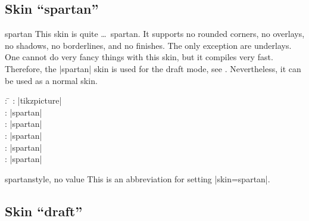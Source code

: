 \clearpage

\subsection{Skin \enquote{spartan}}\label{subsec:spartan}

\begin{docSkin}{spartan}
  This skin is quite \ldots\ spartan.
  It supports no rounded corners, no overlays, no shadows, no borderlines,
  and no finishes. The only exception are underlays.
  One cannot do very fancy things with this skin, but it compiles very fast.
  Therefore, the |spartan| skin is
  used for the draft mode, see .
  Nevertheless, it can be used as a normal skin.

\begin{tcolorbox}[skintable=spartan]
  \begin{tabbing}
    : \=\kill
    :  \> |tikzpicture|\\ 
    :           \> |spartan|\\
    : \> |spartan|\\ 
    :        \> |spartan|\\
    :    \> |spartan|\\
    :           \> |spartan|
  \end{tabbing}
\end{tcolorbox}
\end{docSkin}


\begin{docTcbKey}{spartan}{}{style, no value}
  This is an abbreviation for setting |skin=spartan|.
\end{docTcbKey}


\begin{dispExample}
\end{dispExample}


\clearpage

\subsection{Skin \enquote{draft}}\label{subsec:draft}

